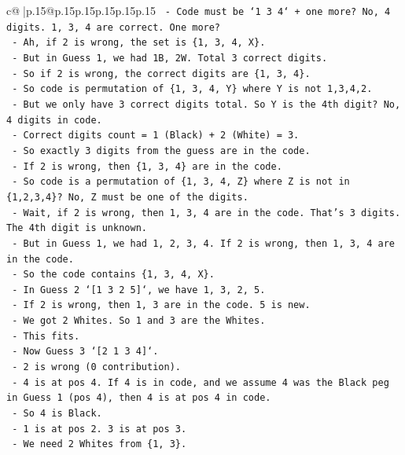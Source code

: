 \documentclass{article}
\begin{document}
{\begin{supertabular}{c@{$\;$}|p{.15\linewidth}@{}p{.15\linewidth}p{.15\linewidth}p{.15\linewidth}p{.15\linewidth}p{.15\linewidth}}
{{{\texttt{    {-} Code must be `1 3 4` + one more? No, 4 digits. 1, 3, 4 are correct. One more?} \\
\texttt{    {-} Ah, if 2 is wrong, the set is \{1, 3, 4, X\}.} \\
\texttt{    {-} But in Guess 1, we had 1B, 2W. Total 3 correct digits.} \\
\texttt{    {-} So if 2 is wrong, the correct digits are \{1, 3, 4\}.} \\
\texttt{    {-} So code is permutation of \{1, 3, 4, Y\} where Y is not 1,3,4,2.} \\
\texttt{    {-} But we only have 3 correct digits total. So Y is the 4th digit? No, 4 digits in code.} \\
\texttt{    {-} Correct digits count = 1 (Black) + 2 (White) = 3.} \\
\texttt{    {-} So exactly 3 digits from the guess are in the code.} \\
\texttt{    {-} If 2 is wrong, then \{1, 3, 4\} are in the code.} \\
\texttt{    {-} So code is a permutation of \{1, 3, 4, Z\} where Z is not in \{1,2,3,4\}? No, Z must be one of the digits.} \\
\texttt{    {-} Wait, if 2 is wrong, then 1, 3, 4 are in the code. That's 3 digits. The 4th digit is unknown.} \\
\texttt{    {-} But in Guess 1, we had 1, 2, 3, 4. If 2 is wrong, then 1, 3, 4 are in the code.} \\
\texttt{    {-} So the code contains \{1, 3, 4, X\}.} \\
\texttt{    {-} In Guess 2 `{[}1 3 2 5{]}`, we have 1, 3, 2, 5.} \\
\texttt{    {-} If 2 is wrong, then 1, 3 are in the code. 5 is new.} \\
\texttt{    {-} We got 2 Whites. So 1 and 3 are the Whites.} \\
\texttt{    {-} This fits.} \\
\texttt{    {-} Now Guess 3 `{[}2 1 3 4{]}`.} \\
\texttt{    {-} 2 is wrong (0 contribution).} \\
\texttt{    {-} 4 is at pos 4. If 4 is in code, and we assume 4 was the Black peg in Guess 1 (pos 4), then 4 is at pos 4 in code.} \\
\texttt{    {-} So 4 is Black.} \\
\texttt{    {-} 1 is at pos 2. 3 is at pos 3.} \\
\texttt{    {-} We need 2 Whites from \{1, 3\}.} \\
}}}
\end{supertabular}}
\end{document}
